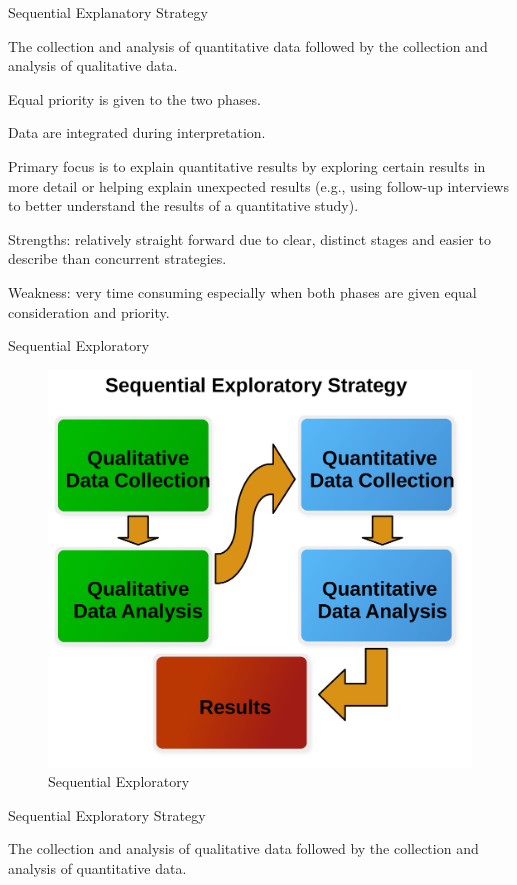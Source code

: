 Sequential Explanatory Strategy

The collection and analysis of quantitative data followed by the collection and analysis of qualitative data.

Equal priority is given to the two phases.

Data are integrated during interpretation.

Primary focus is to explain quantitative results by exploring certain results in more detail or helping explain unexpected results (e.g., using follow-up interviews to better understand the results of a quantitative study).

Strengths: relatively straight forward due to clear, distinct stages and easier to describe than concurrent strategies.

Weakness: very time consuming especially when both phases are given equal consideration
and priority.

Sequential Exploratory

\begin{figure}[H]
	\centering
	\includegraphics[width=\maxwidth{.95\linewidth}]{gfx/14-Seq_Explore}
	\caption{Sequential Exploratory}
	\label{14:fig91}
\end{figure}

Sequential Exploratory Strategy

The collection and analysis of qualitative data followed by the collection and analysis of
quantitative data.

